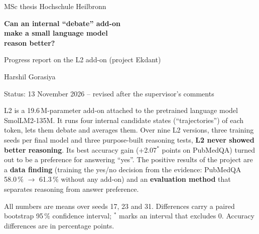 \documentclass[a4paper,11pt,parskip=half]{scrartcl}
\newcommand{\sig}{\ensuremath{^{\ast}}}
\begin{document}
\begin{titlepage}
  \thispagestyle{empty}
  \vspace*{2.2cm}
  {\color{muted}\large\sffamily MSc thesis \textbullet{} Hochschule Heilbronn}\par
  \vspace{0.6cm}
  {\color{ink}\fontsize{26}{31}\selectfont\sffamily\bfseries Can an internal ``debate'' add-on\\[2pt] make a small language model\\[2pt] reason better?\par}
  \vspace{0.6cm}
  {\Large\sffamily\color{lblue} Progress report on the L2 add-on (project Ekdant)\par}
  \vspace{1.4cm}
  \par
  \vspace{0.8cm}
  {\large\sffamily Harshil Gorasiya\par}
  \vspace{0.2cm}
  {\sffamily\color{muted} Status: 13 November 2026 -- revised after the supervisor's comments\par}
  \vfill
  \begin{keybox}[title={In one paragraph}]
  L2 is a 19.6\,M-parameter add-on attached to the pretrained language model
  SmolLM2-135M. It runs four internal candidate states (``trajectories'') of
  each token, lets them debate and averages them. Over nine L2 versions, three
  training seeds per final model and three purpose-built reasoning tests,
  \textbf{L2 never showed better reasoning}. Its best accuracy gain
  (+2.07\sig{} points on PubMedQA) turned out to be a preference for answering
  ``yes''. The positive results of the project are a \textbf{data finding}
  (training the yes/no decision from the evidence: PubMedQA
  58.0\,\% $\rightarrow$ 61.3\,\% without any add-on) and an
  \textbf{evaluation method} that separates reasoning from answer preference.
  \end{keybox}
  \vspace{0.4cm}
  {\footnotesize\color{muted} All numbers are means over seeds 17, 23 and 31. Differences carry a paired bootstrap 95\,\% confidence interval; \sig{} marks an interval that excludes 0. Accuracy differences are in percentage points.\par}
\end{titlepage}
\end{document}
